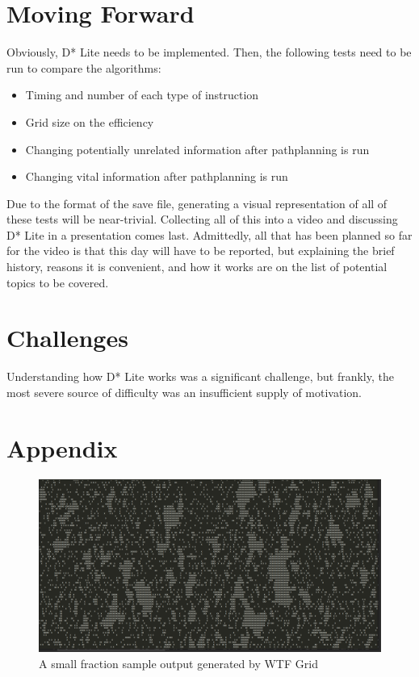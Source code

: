 \documentclass{article}
\begin{document}
\section{Moving Forward}

Obviously, D* Lite needs to be implemented. Then, the following tests need
to be run to compare the algorithms:

\begin{itemize}
    \item Timing and number of each type of instruction
    \item Grid size on the efficiency
    \item Changing potentially unrelated information after pathplanning is run
    \item Changing vital information after pathplanning is run
\end{itemize}

Due to the format of the save file, generating a visual representation of all
of these tests will be near-trivial. Collecting all of this into a video
and discussing D* Lite in a presentation comes last. Admittedly, all that has
been planned so far for the video is that this day will have to be reported,
but explaining the brief history, reasons it is convenient, and how it works
are on the list of potential topics to be covered.

\section*{Challenges}

Understanding how D* Lite works was a significant challenge, but frankly, the
most severe source of difficulty was an insufficient supply of motivation.

\section*{Appendix}

\begin{figure}[H]
    \includegraphics[scale=0.2]{map}
    \caption{A small fraction sample output generated by WTF Grid}
\end{figure}
\end{document}
